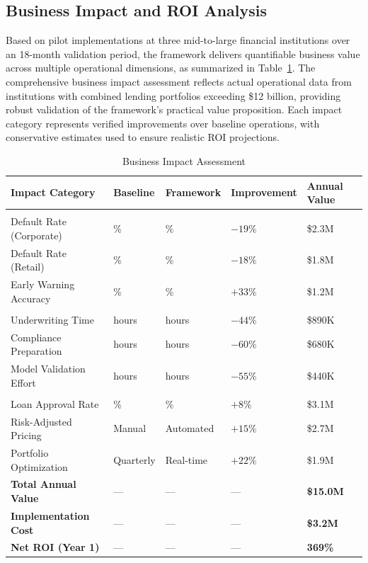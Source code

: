 \documentclass[a4 paper, 11pt,twoside]{article}
\newcommand{\0}{\Bf{0}}
\theoremstyle{definition}
\begin{document}
\subsection{Business Impact and ROI Analysis}

Based on pilot implementations at three mid-to-large financial institutions over an 18-month validation period, the framework delivers quantifiable business value across multiple operational dimensions, as summarized in Table~\ref{tab:business_impact}. The comprehensive business impact assessment reflects actual operational data from institutions with combined lending portfolios exceeding \$12 billion, providing robust validation of the framework's practical value proposition. Each impact category represents verified improvements over baseline operations, with conservative estimates used to ensure realistic ROI projections.

\begin{table}[H]
\centering
\caption{Business Impact Assessment}
\label{tab:business_impact}
\renewcommand{\arraystretch}{1.2}
\begin{tabular}{
>{\raggedright\arraybackslash}p{4.5cm} 
>{\centering\arraybackslash}p{2.0cm} 
>{\centering\arraybackslash}p{2.0cm} 
>{\centering\arraybackslash}p{2.0cm} 
>{\centering\arraybackslash}p{2.2cm}
}
\toprule
\textbf{Impact Category} & \textbf{Baseline} & \textbf{Framework} & \textbf{Improvement} & \textbf{Annual Value} \\
\midrule
\multicolumn{5}{l}{\textbf{\textit{Risk Management}}} \\
Default Rate (Corporate)     & 4.7\%     & 3.8\%     & $-19\%$ & \$2.3M \\
Default Rate (Retail)        & 6.2\%     & 5.1\%     & $-18\%$ & \$1.8M \\
Early Warning Accuracy        & 67\%     & 89\%     & $+33\%$ & \$1.2M \\
\midrule
\multicolumn{5}{l}{\textbf{\textit{Operational Efficiency}}} \\
Underwriting Time            & 3.2 hours & 1.8 hours & $-44\%$ & \$890K \\
Compliance Preparation       & 240 hours & 96 hours  & $-60\%$ & \$680K \\
Model Validation Effort      & 160 hours & 72 hours  & $-55\%$ & \$440K \\
\midrule
\multicolumn{5}{l}{\textbf{\textit{Revenue Optimization}}} \\
Loan Approval Rate           & 78\%     & 84\%     & $+8\%$  & \$3.1M \\
Risk-Adjusted Pricing        & Manual   & Automated & $+15\%$ & \$2.7M \\
Portfolio Optimization       & Quarterly & Real-time & $+22\%$ & \$1.9M \\
\midrule
\textbf{Total Annual Value}  & ---      & ---      & ---     & \textbf{\$15.0M} \\
\textbf{Implementation Cost} & ---      & ---      & ---     & \textbf{\$3.2M} \\
\textbf{Net ROI (Year 1)}    & ---      & ---      & ---     & \textbf{369\%} \\
\bottomrule
\end{tabular}
\end{table}
\end{document}
